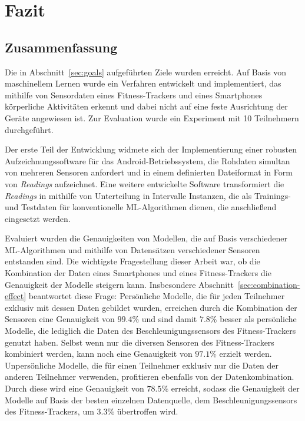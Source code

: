 \chapter{Fazit}
\label{chap:conclusions}

\section{Zusammenfassung}
Die in Abschnitt~\ref{sec:goals} aufgeführten Ziele wurden erreicht. Auf Basis von maschinellem Lernen wurde ein Verfahren entwickelt und implementiert, das mithilfe von Sensordaten eines Fitness-Trackers und eines Smartphones körperliche Aktivitäten erkennt und dabei nicht auf eine feste Ausrichtung der Geräte angewiesen ist. Zur Evaluation wurde ein Experiment mit 10 Teilnehmern durchgeführt.

Der erste Teil der Entwicklung widmete sich der Implementierung einer robusten Aufzeichnungssoftware für das Android-Betriebssystem, die Rohdaten simultan von mehreren Sensoren anfordert und in einem definierten Dateiformat in Form von \textit{Readings} aufzeichnet. Eine weitere entwickelte Software transformiert die \textit{Readings} in mithilfe von Unterteilung in Intervalle Instanzen, die als Trainings- und Testdaten für konventionelle ML-Algorithmen dienen, die anschließend eingesetzt werden.

Evaluiert wurden die Genauigkeiten von Modellen, die auf Basis verschiedener ML-Algorithmen und mithilfe von Datensätzen verschiedener Sensoren entstanden sind. Die wichtigste Fragestellung dieser Arbeit war, ob die Kombination der Daten eines Smartphones und eines Fitness-Trackers die Genauigkeit der Modelle steigern kann. Insbesondere Abschnitt~\ref{sec:combination-effect} beantwortet diese Frage: Persönliche Modelle, die für jeden Teilnehmer exklusiv mit dessen Daten gebildet wurden, erreichen durch die Kombination der Sensoren eine Genauigkeit von $99.4 \%$ und sind damit $7.8 \%$ besser als persönliche Modelle, die lediglich die Daten des Beschleunigungssensors des Fitness-Trackers genutzt haben. Selbst wenn nur die diversen Sensoren des Fitness-Trackers kombiniert werden, kann noch eine Genauigkeit von $97.1 \%$ erzielt werden. Unpersönliche Modelle, die für einen Teilnehmer exklusiv nur die Daten der anderen Teilnehmer verwenden, profitieren ebenfalls von der Datenkombination. Durch diese wird eine Genauigkeit von $78.5 \%$ erreicht, sodass die Genauigkeit der Modelle auf Basis der besten einzelnen Datenquelle, dem Beschleunigungssensors des Fitness-Trackers, um $3.3 \%$ übertroffen wird.

